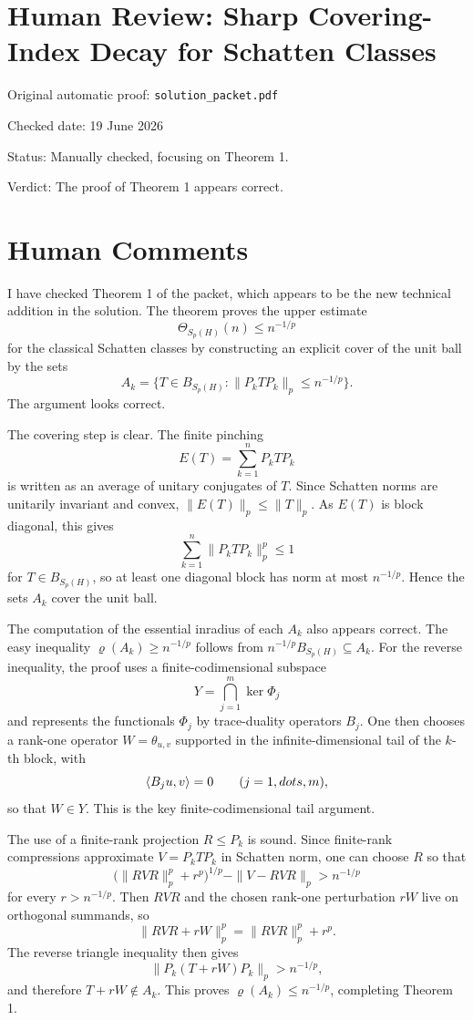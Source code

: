 ﻿\documentclass[11pt]{article}
\begin{document}
\section*{Human Review: Sharp Covering-Index Decay for Schatten Classes}

\noindent Original automatic proof: \texttt{solution\_packet.pdf}

\noindent Checked date: 19 June 2026

\noindent Status: Manually checked, focusing on Theorem 1.

\noindent Verdict: The proof of Theorem 1 appears correct.

\section*{Human Comments}

I have checked Theorem 1 of the packet, which appears to be the new technical
addition in the solution.  The theorem proves the upper estimate
\[
  \Theta_{S_p(H)}(n)\le n^{-1/p}
\]
for the classical Schatten classes by constructing an explicit cover of the
unit ball by the sets
\[
  A_k=\{T\in B_{S_p(H)}:\|P_kTP_k\|_p\le n^{-1/p}\}.
\]
The argument looks correct.

The covering step is clear.  The finite pinching
\[
  E(T)=\sum_{k=1}^n P_kTP_k
\]
is written as an average of unitary conjugates of \(T\).  Since Schatten norms
are unitarily invariant and convex, \(\|E(T)\|_p\le \|T\|_p\).  As \(E(T)\) is
block diagonal, this gives
\[
  \sum_{k=1}^n \|P_kTP_k\|_p^p\le 1
\]
for \(T\in B_{S_p(H)}\), so at least one diagonal block has norm at most
\(n^{-1/p}\).  Hence the sets \(A_k\) cover the unit ball.

The computation of the essential inradius of each \(A_k\) also appears
correct.  The easy inequality \(\varrho(A_k)\ge n^{-1/p}\) follows from
\(n^{-1/p}B_{S_p(H)}\subseteq A_k\).  For the reverse inequality, the proof
uses a finite-codimensional subspace
\[
  Y=\bigcap_{j=1}^m\ker\Phi_j
\]
and represents the functionals \(\Phi_j\) by trace-duality operators
\(B_j\).  One then chooses a rank-one operator \(W=\theta_{u,v}\) supported in
the infinite-dimensional tail of the \(k\)-th block, with
\[
  \langle B_j u,v\rangle=0\qquad(j=1,\\dots,m),
\]
so that \(W\in Y\).  This is the key finite-codimensional tail argument.

The use of a finite-rank projection \(R\le P_k\) is sound.  Since finite-rank
compressions approximate \(V=P_kTP_k\) in Schatten norm, one can choose \(R\)
so that
\[
  \bigl(\|RVR\|_p^p+r^p\bigr)^{1/p}-\|V-RVR\|_p>n^{-1/p}
\]
for every \(r>n^{-1/p}\).  Then \(RVR\) and the chosen rank-one perturbation
\(rW\) live on orthogonal summands, so
\[
  \|RVR+rW\|_p^p=\|RVR\|_p^p+r^p.
\]
The reverse triangle inequality then gives
\[
  \|P_k(T+rW)P_k\|_p>n^{-1/p},
\]
and therefore \(T+rW\notin A_k\).  This proves
\(\varrho(A_k)\le n^{-1/p}\), completing Theorem 1.
\end{document}
